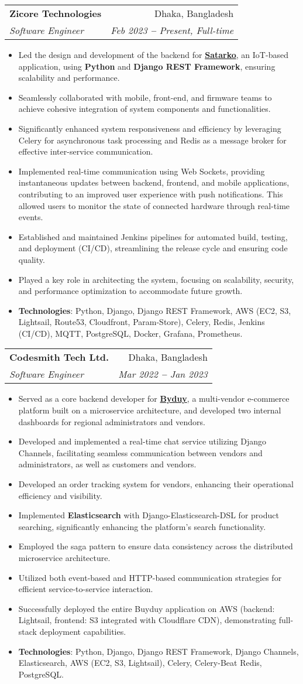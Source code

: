 \documentclass[letterpaper,11pt]{article}
\makeatletter
\newcommand{\resumeItem}[1]{
  \item\small{
    {#1 \vspace{-2pt}}
  }
}
\newcommand{\resumeSubheading}[4]{
  \vspace{-2pt}\item
    \begin{tabular*}{0.97\textwidth}[t]{l@{\extracolsep{\fill}}r}
      \textbf{#1} & #2 \\
      \textit{\small#3} & \textit{\small #4} \\
    \end{tabular*}\vspace{-7pt}
}
\newcommand{\resumeItemListStart}{\begin{itemize}}
\newcommand{\resumeItemListEnd}{\end{itemize}\vspace{-5pt}}
\makeatother
\begin{document}
    \resumeSubheading
      {Zicore Technologies}{Dhaka, Bangladesh}
      {Software Engineer}{Feb 2023 \textbf{--} Present, Full-time}
        \resumeItemListStart
            \resumeItem{Led the design and development of the backend for \textbf{\href{https://satarko.com/}{Satarko}}, an IoT-based application, using \textbf{Python} and \textbf{Django REST Framework}, ensuring scalability and performance.}
            \resumeItem{Seamlessly collaborated with mobile, front-end, and firmware teams to achieve cohesive integration of system components and functionalities.}
            \resumeItem{Significantly enhanced system responsiveness and efficiency by leveraging Celery for asynchronous task processing and Redis as a message broker for effective inter-service communication.}
            \resumeItem{Implemented real-time communication using Web Sockets, providing instantaneous updates between backend, frontend, and mobile applications, contributing to an improved user experience with push notifications. This allowed users to monitor the state of connected hardware through real-time events.}
            \resumeItem{Established and maintained Jenkins pipelines for automated build, testing, and deployment (CI/CD), streamlining the release cycle and ensuring code quality.}
            \resumeItem{Played a key role in architecting the system, focusing on scalability, security, and performance optimization to accommodate future growth.}
            \resumeItem{\textbf{Technologies}: Python, Django, Django REST Framework, AWS (EC2, S3, Lightsail, Route53, Cloudfront, Param-Store), Celery, Redis, Jenkins (CI/CD), MQTT, PostgreSQL, Docker, Grafana, Prometheus.}
        \resumeItemListEnd

    \resumeSubheading
      {Codesmith Tech Ltd.}{Dhaka, Bangladesh}
      {Software Engineer}{Mar 2022 \textbf{--} Jan 2023}
        \resumeItemListStart
            \resumeItem{Served as a core backend developer for \textbf{\href{https://byduy.com/}{Byduy}}, a multi-vendor e-commerce platform built on a microservice architecture, and developed two internal dashboards for regional administrators and vendors.}
            \resumeItem{Developed and implemented a real-time chat service utilizing Django Channels, facilitating seamless communication between vendors and administrators, as well as customers and vendors.}
            \resumeItem{Developed an order tracking system for vendors, enhancing their operational efficiency and visibility.}
            \resumeItem{Implemented \textbf{Elasticsearch} with Django-Elasticsearch-DSL for product searching, significantly enhancing the platform's search functionality.}
            \resumeItem{Employed the saga pattern to ensure data consistency across the distributed microservice architecture.}
            \resumeItem{Utilized both event-based and HTTP-based communication strategies for efficient service-to-service interaction.}
            \resumeItem{Successfully deployed the entire Buyduy application on AWS (backend: Lightsail, frontend: S3 integrated with Cloudflare CDN), demonstrating full-stack deployment capabilities.}
            \resumeItem{\textbf{Technologies}: Python, Django, Django REST Framework, Django Channels, Elasticsearch, AWS (EC2, S3, Lightsail), Celery, Celery-Beat Redis, PostgreSQL.}
        \resumeItemListEnd
\end{document}
